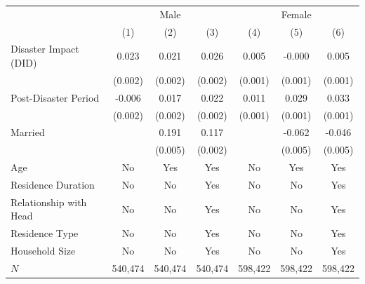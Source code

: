 \documentclass[serif, aspectratio=169]{beamer}
\begin{document}
\begin{frame}[label=employed]
\begin{table}[htbp]
\begin{tabular}{@{}l*{6}{c}@{}}
          &\multicolumn{3}{c}{Male}                                &\multicolumn{3}{c}{Female}                              \\\cmidrule(lr){2-4}\cmidrule(lr){5-7}
          &\multicolumn{1}{c}{(1)}         &\multicolumn{1}{c}{(2)}         &\multicolumn{1}{c}{(3)}         &\multicolumn{1}{c}{(4)}         &\multicolumn{1}{c}{(5)}         &\multicolumn{1}{c}{(6)}         \\
\toprule
Disaster Impact (DID)&    0.023\sym{***}&    0.021\sym{***}&    0.026\sym{***}&    0.005\sym{***}&   -0.000         &    0.005\sym{***}\\
          &  (0.002)         &  (0.002)         &  (0.002)         &  (0.001)         &  (0.001)         &  (0.001)         \\
\addlinespace
Post-Disaster Period&   -0.006\sym{***}&    0.017\sym{***}&    0.022\sym{***}&    0.011\sym{***}&    0.029\sym{***}&    0.033\sym{***}\\
          &  (0.002)         &  (0.002)         &  (0.002)         &  (0.001)         &  (0.001)         &  (0.001)         \\
\addlinespace
Married   &                  &    0.191\sym{***}&    0.117\sym{***}&                  &   -0.062\sym{***}&   -0.046\sym{***}\\
          &                  &  (0.005)         &  (0.002)         &                  &  (0.005)         &  (0.005)         \\
\midrule
Age       &       No         &      Yes         &      Yes         &       No         &      Yes         &      Yes         \\
Residence Duration&       No         &       No         &      Yes         &       No         &       No         &      Yes         \\
Relationship with Head&       No         &       No         &      Yes         &       No         &       No         &      Yes         \\
Residence Type&       No         &       No         &      Yes         &       No         &       No         &      Yes         \\
Household Size&       No         &       No         &      Yes         &       No         &       No         &      Yes         \\
$\textit{N}$&  540,474         &  540,474         &  540,474         &  598,422         &  598,422         &  598,422         \\

\end{tabular}
\end{table}
\end{frame}
\end{document}
